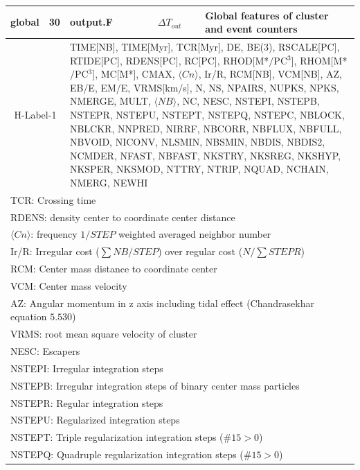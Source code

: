 \begin{longtable}{||p{0.42in}|p{0.25in}|p{0.6in}|p{0.6in}|p{0.4in}|p{2.3in}||}
  global    & 30  & output.F   &              & $\Delta T_{out}$      & Global features of cluster and event counters \\\hline
  \multicolumn{2}{|c|}{ H-Label-1 } & \multicolumn{4}{|p{4.4in}|}{ TIME[NB], TIME[Myr], TCR[Myr], DE, BE(3), RSCALE[PC], RTIDE[PC], RDENS[PC], RC[PC], RHOD[M*$/$PC$^3$], RHOM[M*$/$PC$^3$], MC[M*], CMAX, $\langle Cn\rangle$, Ir/R, RCM[NB], VCM[NB], AZ, EB/E, EM/E, VRMS[km/s], N, NS, NPAIRS, NUPKS, NPKS, NMERGE, MULT, $\langle NB\rangle$, NC, NESC, NSTEPI, NSTEPB, NSTEPR, NSTEPU, NSTEPT, NSTEPQ, NSTEPC, NBLOCK, NBLCKR, NNPRED, NIRRF, NBCORR, NBFLUX, NBFULL, NBVOID, NICONV, NLSMIN, NBSMIN, NBDIS, NBDIS2, NCMDER, NFAST, NBFAST, NKSTRY, NKSREG, NKSHYP, NKSPER, NKSMOD, NTTRY, NTRIP, NQUAD, NCHAIN, NMERG, NEWHI}\\\hline
\multicolumn{6}{|p{5.4in}|}{ TCR: Crossing time }\\
\multicolumn{6}{|p{5.4in}|}{ RDENS: density center to coordinate center distance}\\
\multicolumn{6}{|p{5.4in}|}{ $\langle Cn\rangle$: frequency $1/STEP$ weighted averaged neighbor number}\\
\multicolumn{6}{|p{5.4in}|}{ Ir/R: Irregular cost ($\sum NB/STEP$) over regular cost ($ N/\sum STEPR$)}\\
\multicolumn{6}{|p{5.4in}|}{ RCM: Center mass distance to coordinate center }\\
\multicolumn{6}{|p{5.4in}|}{ VCM: Center mass velocity}\\
\multicolumn{6}{|p{5.4in}|}{ AZ: Angular momentum in z axis including tidal effect (Chandrasekhar equation $5.530$)}\\
\multicolumn{6}{|p{5.4in}|}{ VRMS: root mean square velocity of cluster }\\
\multicolumn{6}{|p{5.4in}|}{ NESC:  Escapers }\\
\multicolumn{6}{|p{5.4in}|}{ NSTEPI: Irregular integration steps }\\
\multicolumn{6}{|p{5.4in}|}{ NSTEPB: Irregular integration steps of binary center mass particles}\\
\multicolumn{6}{|p{5.4in}|}{ NSTEPR: Regular integration steps }\\
\multicolumn{6}{|p{5.4in}|}{ NSTEPU: Regularized integration steps}\\
\multicolumn{6}{|p{5.4in}|}{ NSTEPT: Triple regularization integration steps ($\#15>0$)}\\
\multicolumn{6}{|p{5.4in}|}{ NSTEPQ: Quadruple regularization integration steps ($\#15>0$)}\\

\end{longtable}
